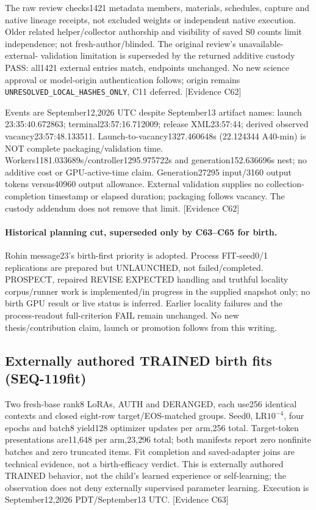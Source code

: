 \documentclass[11pt]{article}
\newcommand{\ev}[1]{\textsf{[Evidence #1]}}
\begin{document}
The raw review checks1421 metadata members, materials, schedules, capture and
native lineage receipts, not excluded weights or independent native execution.
Older related helper/collector authorship and visibility of saved S0 counts limit
independence; not fresh-author/blinded. The original review's unavailable-external-
validation limitation is superseded by the returned additive custody PASS:
all1421 external entries match, endpoints unchanged. No new science approval or
model-origin authentication follows; origin remains
\texttt{UNRESOLVED\_LOCAL\_HASHES\_ONLY}, C11 deferred. \ev{C62}

Events are September12,2026 UTC despite September13 artifact names: launch
23:35:40.672863; terminal23:57:16.712009; release XML23:57:44; derived observed
vacancy23:57:48.133511. Launch-to-vacancy1327.460648s (22.124344 A40-min) is NOT
complete packaging/validation time. Workers1181.033689s/controller1295.975722s
and generation152.636696s nest; no additive cost or GPU-active-time claim.
Generation27295 input/3160 output tokens versus40960 output allowance. External
validation supplies no collection-completion timestamp or elapsed duration;
packaging follows vacancy. The custody addendum does not remove that limit.
\ev{C62}

\paragraph{Historical planning cut, superseded only by C63--C65 for birth.} Rohin message23's
birth-first priority is adopted. Process FIT-seed0/1 replications are prepared
but UNLAUNCHED, not failed/completed. PROSPECT, repaired REVISE EXPECTED handling
and truthful locality corpus/runner work is implemented/in progress in the
supplied snapshot only; no birth GPU result or live status is inferred. Earlier
locality failures and the process-readout full-criterion FAIL remain unchanged.
No new thesis/contribution claim, launch or promotion follows from this writing.

\subsection{Externally authored TRAINED birth fits (SEQ-119fit)}
Two fresh-base rank8 LoRAs, AUTH and DERANGED, each use256 identical contexts
and closed eight-row target/EOS-matched groups. Seed0, LR$10^{-4}$, four epochs
and batch8 yield128 optimizer updates per arm,256 total. Target-token
presentations are11{,}648 per arm,23{,}296 total; both manifests report zero
nonfinite batches and zero truncated items. Fit completion and saved-adapter
joins are technical evidence, not a birth-efficacy verdict. This is externally
authored TRAINED behavior, not the child's learned experience or self-learning;
the observation does not deny externally supervised parameter learning.
Execution is September12,2026 PDT/September13 UTC. \ev{C63}
\end{document}
